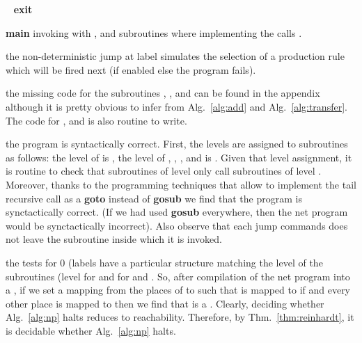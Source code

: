 \documentclass{fsttcs}
\begin{document}
\noindent {}\begin{minipage}[t]{.44\linewidth}
	\vspace{0pt}
	{\footnotesize
\begin{algorithm}[H]
\;
      \;
			\;
			\gosub \;
\nlset{}
\nlset{:} \goto  \Kor  \Kor\ \goto \;
[\ldots]\;
\nlset{:}  \;
      \;
      \;
\gosub \;
			\goto \textbf{exit}\;
			[\ldots]\;
\nlset{:}  \;
			\gosub \;
			\gosub \;
      \;
			\gosub \;
			\nlset{}
			  \;
			\goto \;
			[\ldots]\;
\nlset{:} \;
			\gosub \;
			\gosub \;
			\;
			\gosub \;
			\nlset{}
			  \;
			\goto \;
			[\ldots]\;
			 \Return{}\;
			[\ldots]\;
			 \halt\;
\caption{ \footnotesize \textbf{main} invoking  with ,
 and subroutines  where  implementing the calls .\label{alg:np}}
\end{algorithm}}
\end{minipage}\begin{minipage}[t]{.50\linewidth}
	\noindent \textbullet{} the non-deterministic jump at label  simulates
		the selection of a production rule  which will be fired next
		(if enabled else the program fails). 

	\noindent \textbullet{} 
the missing code for the subroutines
		,
		,
		and  can be found in the appendix although it is pretty obvious to infer from
		Alg.~\ref{alg:add} and Alg.~\ref{alg:transfer}. The code for ,
		 and  is also routine to write.

		\noindent \textbullet{}
the program is syntactically correct. First, the levels are assigned to
		subroutines as follows: the level of  is , the
		level of ,
		,
		,
		 and 
		is .  Given that level assignment, it is routine to check that
		subroutines of level  only call subroutines of level .
		Moreover, thanks to the programming techniques that allow to implement the
		tail recursive call as a \textbf{goto} instead of \textbf{gosub} we find
		that the program is synctactically correct.  (If we had used \textbf{gosub}
		everywhere, then the net program would be synctactically incorrect).  Also
		observe that each jump commands does not leave the subroutine inside which it is
		invoked.  

\noindent \textbullet{} the tests for 0 (labels
		 have a particular
		structure matching the level of the subroutines (level  for
		 and  for  and
		. So, after compilation of the net program into a  ,
		if we set a mapping  from the places of
		 to  such that  is mapped to  if  and every other place is mapped to  then we
		find that  is a . Clearly, deciding whether
		Alg.~\ref{alg:np} halts reduces to  reachability.
		Therefore, by Thm.~\ref{thm:reinhardt}, it is decidable whether Alg.~\ref{alg:np} halts.
\end{minipage}\hfill
\end{document}
